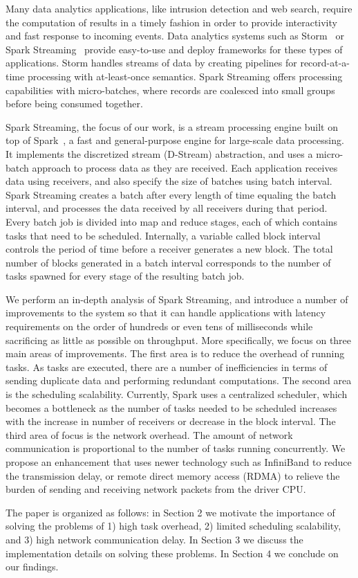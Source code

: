 \noindent

Many data analytics applications, like intrusion detection and web search, require the computation of results in a timely fashion in order to provide interactivity and fast response to incoming events.
Data analytics systems such as Storm~\cite{Storm} or Spark Streaming~\cite{SparkStreaming} provide easy-to-use and deploy frameworks for these types of applications. Storm handles streams of data by creating pipelines for record-at-a-time processing with at-least-once semantics. Spark Streaming offers processing capabilities with micro-batches, where records are coalesced into small groups before being consumed together.

%
%
Spark Streaming, the focus of our work, is a stream processing engine built on top of Spark~\cite{Spark}, a fast and general-purpose engine for large-scale data processing. It implements the discretized stream (D-Stream) abstraction, and uses a micro-batch approach to process data as they are received. Each application receives data using receivers, and also specify the size of batches using batch interval. Spark Streaming creates a batch after every length of time equaling the batch interval, and processes the data received by all receivers during that period. Every batch job is divided into map and reduce stages, each of which contains tasks that need to be scheduled. Internally, a variable called block interval controls the period of time before a receiver generates a new block. The total number of blocks generated in a batch interval corresponds to the number of tasks spawned for every stage of the resulting batch job.

We perform an in-depth analysis of Spark Streaming, and introduce a number of improvements to the system so that it can handle applications with latency requirements on the order of hundreds or even tens of milliseconds while sacrificing as little as possible on throughput. More specifically, we focus on three main areas of improvements. The first area is to reduce the overhead of running tasks. As tasks are executed, there are a number of inefficiencies in terms of sending duplicate data and performing redundant computations. The second area is the scheduling scalability. Currently, Spark uses a centralized scheduler, which becomes a bottleneck as the number of tasks needed to be scheduled increases with the increase in number of receivers or decrease in the block interval. The third area of focus is the network overhead. The amount of network communication is proportional to the number of tasks running concurrently. We propose an enhancement that uses newer technology such as InfiniBand to reduce the transmission delay, or remote direct memory access (RDMA) to relieve the burden of sending and receiving network packets from the driver CPU.

The paper is organized as follows: in Section 2 we motivate the importance of solving the problems of 1) high task overhead, 2) limited scheduling scalability, and 3) high network communication delay. In Section 3 we discuss the implementation details on solving these problems. In Section 4 we conclude on our findings.

